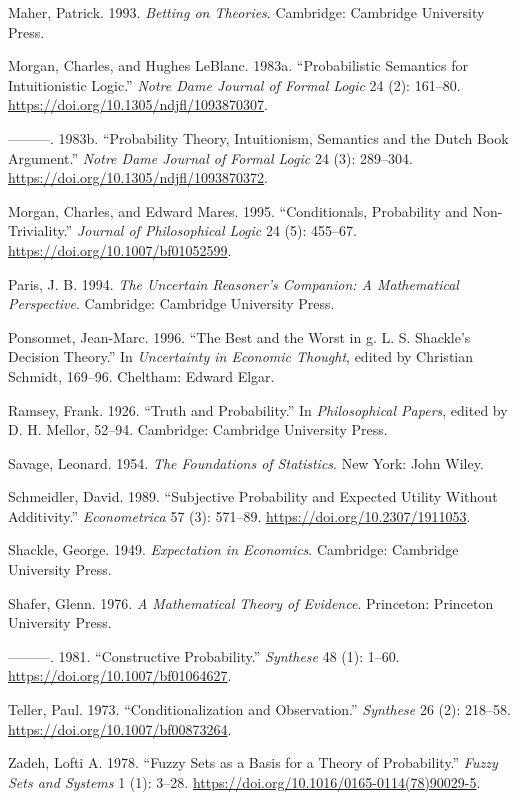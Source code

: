 \documentclass[
  11pt,
  letterpaper,
  DIV=11,
  numbers=noendperiod,
  oneside]{scrartcl}
\newlength{\cslhangindent}
\newenvironment{CSLReferences}[2] %
 {\begin{list}{}{%
  \setlength{\itemindent}{0pt}
  \setlength{\leftmargin}{0pt}
  \setlength{\parsep}{0pt}
  \ifodd #1
   \setlength{\leftmargin}{\cslhangindent}
   \setlength{\itemindent}{-1\cslhangindent}
  \fi
  \setlength{\itemsep}{#2\baselineskip}}}
 {\end{list}}
\begin{document}
\begin{CSLReferences}{1}{0}
Maher, Patrick. 1993. \emph{Betting on Theories}. Cambridge: Cambridge
University Press.

Morgan, Charles, and Hughes LeBlanc. 1983a. {``Probabilistic Semantics
for Intuitionistic Logic.''} \emph{Notre Dame Journal of Formal Logic}
24 (2): 161--80. \url{https://doi.org/10.1305/ndjfl/1093870307}.

---------. 1983b. {``Probability Theory, Intuitionism, Semantics and the
Dutch Book Argument.''} \emph{Notre Dame Journal of Formal Logic} 24
(3): 289--304. \url{https://doi.org/10.1305/ndjfl/1093870372}.

Morgan, Charles, and Edward Mares. 1995. {``Conditionals, Probability
and Non-Triviality.''} \emph{Journal of Philosophical Logic} 24 (5):
455--67. \url{https://doi.org/10.1007/bf01052599}.

Paris, J. B. 1994. \emph{The Uncertain Reasoner's Companion: A
Mathematical Perspective}. Cambridge: Cambridge University Press.

Ponsonnet, Jean-Marc. 1996. {``The Best and the Worst in g. L. S.
Shackle's Decision Theory.''} In \emph{Uncertainty in Economic Thought},
edited by Christian Schmidt, 169--96. Cheltham: Edward Elgar.

Ramsey, Frank. 1926. {``Truth and Probability.''} In \emph{Philosophical
Papers}, edited by D. H. Mellor, 52--94. Cambridge: Cambridge University
Press.

Savage, Leonard. 1954. \emph{The Foundations of Statistics}. New York:
John Wiley.

Schmeidler, David. 1989. {``Subjective Probability and Expected Utility
Without Additivity.''} \emph{Econometrica} 57 (3): 571--89.
\url{https://doi.org/10.2307/1911053}.

Shackle, George. 1949. \emph{Expectation in Economics}. Cambridge:
Cambridge University Press.

Shafer, Glenn. 1976. \emph{A Mathematical Theory of Evidence}.
Princeton: Princeton University Press.

---------. 1981. {``Constructive Probability.''} \emph{Synthese} 48 (1):
1--60. \url{https://doi.org/10.1007/bf01064627}.

Teller, Paul. 1973. {``Conditionalization and Observation.''}
\emph{Synthese} 26 (2): 218--58.
\url{https://doi.org/10.1007/bf00873264}.

Zadeh, Lofti A. 1978. {``Fuzzy Sets as a Basis for a Theory of
Probability.''} \emph{Fuzzy Sets and Systems} 1 (1): 3--28.
\url{https://doi.org/10.1016/0165-0114(78)90029-5}.

\end{CSLReferences}
\end{document}
